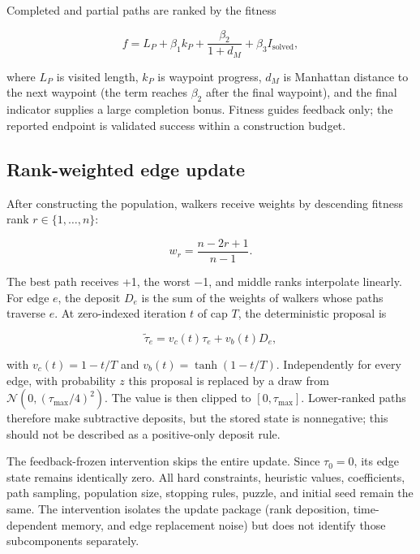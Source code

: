 \documentclass[pdflatex,sn-basic,iicol]{sn-jnl}
\begin{document}
Completed and partial paths are ranked by the fitness

\begin{equation}
f=L_P+\beta_1 k_P+\frac{\beta_2}{1+d_M}+\beta_3 I_{\mathrm{solved}},
\end{equation}

where $L_P$ is visited length, $k_P$ is waypoint progress, $d_M$ is Manhattan distance to the next waypoint (the term reaches $\beta_2$ after the final waypoint), and the final indicator supplies a large completion bonus. Fitness guides feedback only; the reported endpoint is validated success within a construction budget.

\subsection{Rank-weighted edge update}

After constructing the population, walkers receive weights by descending fitness rank $r\in\{1,\ldots,n\}$:

\begin{equation}
w_r=\frac{n-2r+1}{n-1}.
\end{equation}

The best path receives +1, the worst \(-\)1, and middle ranks interpolate linearly. For edge $e$, the deposit $D_e$ is the sum of the weights of walkers whose paths traverse $e$. At zero-indexed iteration $t$ of cap $T$, the deterministic proposal is

\begin{equation}
\widetilde{\tau}_e=v_c(t)\tau_e+v_b(t)D_e,
\end{equation}

with $v_c(t)=1-t/T$ and $v_b(t)=\tanh(1-t/T)$. Independently for every edge, with probability $z$ this proposal is replaced by a draw from $\mathcal{N}(0,(\tau_{\max}/4)^2)$. The value is then clipped to $[0,\tau_{\max}]$. Lower-ranked paths therefore make subtractive deposits, but the stored state is nonnegative; this should not be described as a positive-only deposit rule.

The feedback-frozen intervention skips the entire update. Since $\tau_0=0$, its edge state remains identically zero. All hard constraints, heuristic values, coefficients, path sampling, population size, stopping rules, puzzle, and initial seed remain the same. The intervention isolates the update package (rank deposition, time-dependent memory, and edge replacement noise) but does not identify those subcomponents separately.
\end{document}
